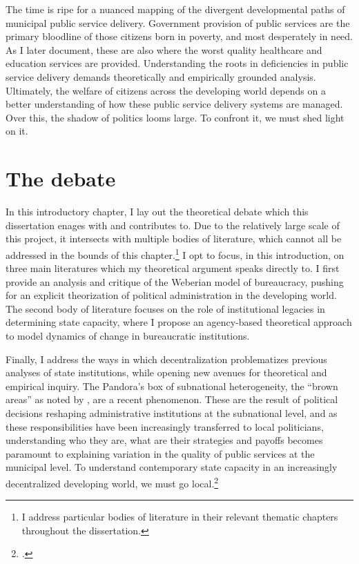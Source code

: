 \documentclass[12pt,]{book}
\let\rmarkdownfootnote\footnote%
\def\footnote{\protect\rmarkdownfootnote}
\begin{document}
The time is ripe for a nuanced mapping of the divergent developmental paths of municipal public service delivery. Government provision of public services are the primary bloodline of those citizens born in poverty, and most desperately in need. As I later document, these are also where the worst quality healthcare and education services are provided. Understanding the roots in deficiencies in public service delivery demands theoretically and empirically grounded analysis. Ultimately, the welfare of citizens across the developing world depends on a better understanding of how these public service delivery systems are managed. Over this, the shadow of politics looms large. To confront it, we must shed light on it.

\hypertarget{the-debate}{%
\section{The debate}\label{the-debate}}

In this introductory chapter, I lay out the theoretical debate which this dissertation enages with and contributes to. Due to the relatively large scale of this project, it intersects with multiple bodies of literature, which cannot all be addressed in the bounds of this chapter.\footnote{I address particular bodies of literature in their relevant thematic chapters throughout the dissertation.} I opt to focus, in this introduction, on three main literatures which my theoretical argument speaks directly to. I first provide an analysis and critique of the Weberian model of bureaucracy, pushing for an explicit theorization of political administration in the developing world. The second body of literature focuses on the role of institutional legacies in determining state capacity, where I propose an agency-based theoretical approach to model dynamics of change in bureaucratic institutions.

Finally, I address the ways in which decentralization problematizes previous analyses of state institutions, while opening new avenues for theoretical and empirical inquiry. The Pandora's box of subnational heterogeneity, the ``brown areas'' as noted by \citet{odonnell_state_1993}, are a recent phenomenon. These are the result of political decisions reshaping administrative institutions at the subnational level, and as these responsibilities have been increasingly transferred to local politicians, understanding who they are, what are their strategies and payoffs becomes paramount to explaining variation in the quality of public services at the municipal level. To understand contemporary state capacity in an increasingly decentralized developing world, we must go local.\footnote{\citet{grindle_going_2007}.}
\end{document}
